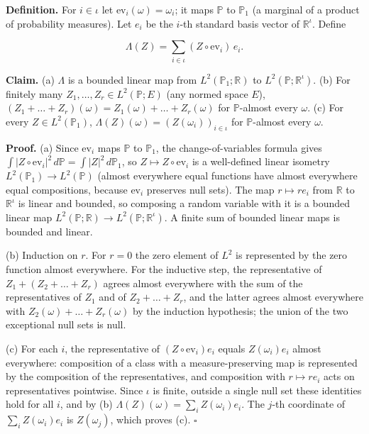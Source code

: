 \documentclass[11pt,a4paper]{article}
\begin{document}
\textbf{Definition.} For \(i\in\iota\) let \(\mathrm{ev}_i(\omega)=\omega_i\); it maps \(\mathbb P\) to \(\mathbb P_1\) (a marginal of a product of probability measures). Let \(e_i\) be the \(i\)-th standard basis vector of \(\mathbb R^\iota\). Define


\[\Lambda(Z)=\sum_{i\in\iota}(Z\circ\mathrm{ev}_i)\,e_i .\]


\textbf{Claim.} (a) \(\Lambda\) is a bounded linear map from \(L^2(\mathbb P_1;\mathbb R)\) to \(L^2(\mathbb P;\mathbb R^\iota)\). (b) For finitely many \(Z_1,\dots,Z_r\in L^2(\mathbb P;E)\) (any normed space \(E\)), \((Z_1+\dots+Z_r)(\omega)=Z_1(\omega)+\dots+Z_r(\omega)\) for \(\mathbb P\)-almost every \(\omega\). (c) For every \(Z\in L^2(\mathbb P_1)\), \(\Lambda(Z)(\omega)=(Z(\omega_i))_{i\in\iota}\) for \(\mathbb P\)-almost every \(\omega\).




\textbf{Proof.} (a) Since \(\mathrm{ev}_i\) maps \(\mathbb P\) to \(\mathbb P_1\), the change-of-variables formula gives \(\int|Z\circ\mathrm{ev}_i|^2\,d\mathbb P=\int|Z|^2\,d\mathbb P_1\), so \(Z\mapsto Z\circ\mathrm{ev}_i\) is a well-defined linear isometry \(L^2(\mathbb P_1)\to L^2(\mathbb P)\) (almost everywhere equal functions have almost everywhere equal compositions, because \(\mathrm{ev}_i\) preserves null sets). The map \(r\mapsto re_i\) from \(\mathbb R\) to \(\mathbb R^\iota\) is linear and bounded, so composing a random variable with it is a bounded linear map \(L^2(\mathbb P;\mathbb R)\to L^2(\mathbb P;\mathbb R^\iota)\). A finite sum of bounded linear maps is bounded and linear.




(b) Induction on \(r\). For \(r=0\) the zero element of \(L^2\) is represented by the zero function almost everywhere. For the inductive step, the representative of \(Z_1+(Z_2+\dots+Z_r)\) agrees almost everywhere with the sum of the representatives of \(Z_1\) and of \(Z_2+\dots+Z_r\), and the latter agrees almost everywhere with \(Z_2(\omega)+\dots+Z_r(\omega)\) by the induction hypothesis; the union of the two exceptional null sets is null.




(c) For each \(i\), the representative of \((Z\circ\mathrm{ev}_i)e_i\) equals \(Z(\omega_i)e_i\) almost everywhere: composition of a class with a measure-preserving map is represented by the composition of the representatives, and composition with \(r\mapsto re_i\) acts on representatives pointwise. Since \(\iota\) is finite, outside a single null set these identities hold for all \(i\), and by (b) \(\Lambda(Z)(\omega)=\sum_iZ(\omega_i)e_i\). The \(j\)-th coordinate of \(\sum_iZ(\omega_i)e_i\) is \(Z(\omega_j)\), which proves (c). \(\square\)
\end{document}
